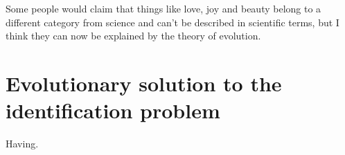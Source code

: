 
\begin{savequote}[99mm]
Some people would claim that things like love, joy and beauty belong to a different category from science and can't be described in scientific terms, but I think they can now be explained by the theory of evolution.
\end{savequote}

\chapter{Evolutionary solution to the identification problem}
\label{chap:id-bin}
Having.